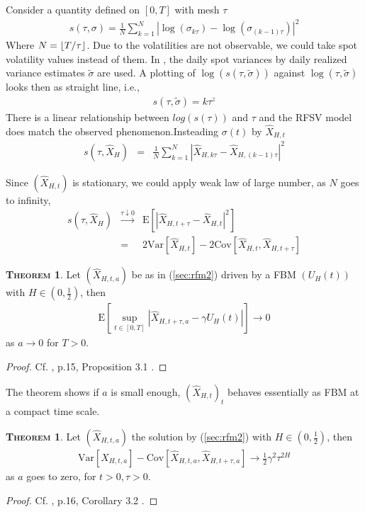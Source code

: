 \documentclass[a4paper, twoside, 11pt]{article}
\theoremstyle{definition}
\newtheorem{theorem}[definition]{\scshape Theorem}
\DeclarePairedDelimiter\floor{\lfloor}{\rfloor}
\begin{document}
Consider a quantity defined on $[0, T]$ with mesh $\tau$
\begin{eqnarray}
  s(\tau, \sigma) = \frac{1}{N}\sum\limits_{k=1}^N|\log(\sigma_{k\tau}) - \log(\sigma_{(k-1)\tau})|^2
  \label{sec:smo}
\end{eqnarray}
Where $N = \floor{T/\tau}$. Due to the volatilities are not observable, we could take spot volatility values instead of them. In \cite{chridito}, the daily spot variances by daily realized variance estimates $\tilde{\sigma}$ are used. A plotting of $\log(s(\tau, \tilde{\sigma}))$ against $\log(\tau, \tilde{\sigma})$ looks then as straight line, i.e.,
\begin{eqnarray}
  s(\tau, \tilde{\sigma}) =  k\tau^z
  \label{sec:smth}
\end{eqnarray}
There is a linear relationship between $log(s(\tau))$ and $\tau$ and the RFSV model does match the observed phenomenon.Insteading $\sigma(t)$ by $\hat{X}_{H,t}$ 
\begin{eqnarray}
  s(\tau, \hat{X}_{H}) &=&  \frac {1}{N}\sum\limits_{k=1}^N|\hat{X}_{H,k\tau} - \hat{X}_{H,(k-1)\tau}|^2\nonumber
\end{eqnarray}

Since $(\hat{X}_{H,t})$ is stationary, we could apply weak law of large number, as $N$ goes to infinity,
\begin{eqnarray}
  s(\tau, \hat{X}_{H}) &\overset{\tau\downarrow0}{\rightarrow}& \mathrm{E}[|\hat{X}_{H,t+\tau}-\hat{X}_{H,t}|^2]\nonumber\\
  &=& 2 \mathrm{Var}[\hat{X}_{H,t}] - 2 \mathrm{Cov}[\hat{X}_{H,t}, \hat{X}_{H,t+\tau}]\nonumber
  \label{sec:smtsv}
\end{eqnarray}

\begin{theorem}
  Let $(\hat{X}_{H, t, a})$ be as in (\ref{sec:rfm2}) driven by a FBM $(U_H(t))$ with $H\in (0,\frac{1}{2})$, then
  \begin{eqnarray*}
	\mathrm{E}[\sup\limits_{t\in [0, T]}|\hat{X}_{H,t+\tau, a} - \gamma U_H(t)|]\rightarrow 0
  \end{eqnarray*}
 as $a\rightarrow 0$ for $T > 0$.
\end{theorem}
\begin{proof}
  Cf. \cite{gradin}, p.15, Proposition 3.1 .
\end{proof}

The theorem shows if $a$ is small enough, $(\hat{X}_{H, t})_t$ behaves essentially as FBM at a compact time scale.

\begin{theorem}
  Let $(\hat{X}_{H, t, a})$ the solution by (\ref{sec:rfm2}) with $H\in(0, \frac{1}{2})$, then 
  \begin{eqnarray}
	\mathrm{Var}[\hat{X}_{H,t, a}] - \mathrm{Cov}[\hat{X}_{H,t, a}, \hat{X}_{H,t+\tau, a}] \rightarrow \frac{1}{2} \gamma^2\tau^{2H}
	\label{sec:rfsv}
  \end{eqnarray}
 as $a$ goes to zero, for $t>0, \tau>0$.
\end{theorem}
\begin{proof}
  Cf. \cite{gradin}, p.16, Corollary 3.2 .
\end{proof}
\end{document}

